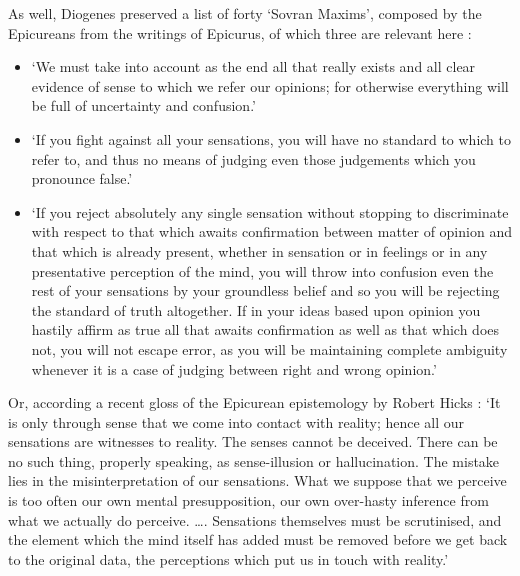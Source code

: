 As well, Diogenes preserved a list of forty `Sovran Maxims', composed by the Epicureans from the writings of Epicurus, of which three are relevant here \cite{Diogenes1931}:
\begin{itemize}
\item[22.]{`We must take into account as the end all that really exists and all clear evidence of sense to which we refer our opinions; for otherwise everything will be full of uncertainty and confusion.'}
\item[23.]{`If you fight against all your sensations, you will have no standard to which to refer to, and thus no means of judging even those judgements which you pronounce false.'}
\item[24.]{`If you reject absolutely any single sensation without stopping to discriminate with respect to that which awaits confirmation between matter of opinion and that which is already present, whether in sensation or in feelings or in any presentative perception of the mind, you will throw into confusion even the rest of your sensations by your groundless belief and so you will be rejecting the standard of truth altogether. If in your ideas based upon opinion you hastily affirm as true all that awaits confirmation as well as that which does not, you will not escape error, as you will be maintaining complete ambiguity whenever it is a case of judging between right and wrong opinion.'}
\end{itemize}
Or, according a recent gloss of the Epicurean epistemology by Robert Hicks \cite{Hicks1962}: `It is only through sense that we come into contact with reality; hence all our sensations are witnesses to reality. The senses cannot be deceived. There can be no such thing, properly speaking, as sense-illusion or hallucination. The mistake lies in the misinterpretation of our sensations. What we suppose that we perceive is too often our own mental presupposition, our own over-hasty inference from what we actually do perceive. \ldots. Sensations themselves must be scrutinised, and the element which the mind itself has added must be removed before we get back to the original data, the perceptions which put us in touch with reality.'

